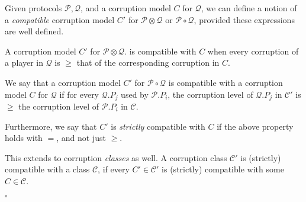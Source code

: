 \begin{definition}
  \label{def:compatc}
  Given protocols $\mathscr{P}, \mathscr{Q}$, and a corruption model
  $C$ for $\mathscr{Q}$, we can define a notion of a \emph{compatible}
  corruption model $C'$ for $\mathscr{P} \otimes \mathscr{Q}$ or $\mathscr{P} \circ \mathscr{Q}$,
  provided these expressions are well defined.

  A corruption model $C'$ for $\mathscr{P} \otimes \mathscr{Q}$.
  is compatible with $C$ when every corruption of a player
  in $\mathscr{Q}$ is $\geq$ that of the corresponding corruption in $C$.

  We say that a corruption model $C'$ for $\mathscr{P} \circ \mathscr{Q}$ is compatible with
a corruption model $C$ for $\mathscr{Q}$ if for every
$\mathscr{Q}.P_j$ used by $\mathscr{P}.P_i$, the corruption
level of $\mathscr{Q}.P_j$ in $\mathscr{C}'$ is $\geq$ the corruption level of $\mathscr{P}.P_i$
in $\mathscr{C}$.

  Furthermore, we say that $C'$ is \emph{strictly} compatible
  with $C$ if the above property holds with $=$, and not just $\geq$.

  This extends to corruption \emph{classes} as well.
  A corruption class $\mathscr{C}'$ is (strictly) compatible with a class $\mathscr{C}$,
  if every $C' \in \mathscr{C}'$ is (strictly) compatible with some $C \in \mathscr{C}$.

  $\square$
\end{definition}

